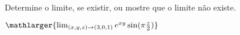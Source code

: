 Determine o limite, se existir, ou mostre que o limite não existe.

\item$\mathlarger{\lim_{(x,y,z)\rightarrow(3,0,1)} e^{xy}\sin (\pi \frac z 2)}$

